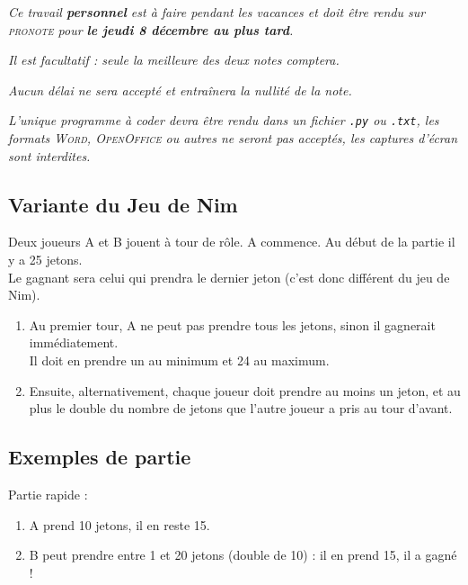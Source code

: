 \documentclass[a4paper,12pt,french]{article}
\begin{document}


\textit{Ce travail \textbf{personnel} est à faire pendant les vacances et doit être rendu sur \textsc{pronote} pour \textbf{le jeudi 8 décembre au plus tard}. }

\textit{Il est facultatif : seule la meilleure des deux notes comptera.}

\textit{Aucun délai ne sera accepté et entraînera la nullité de la note.}

\textit{L'unique programme à coder devra être rendu dans un fichier \texttt{.py} ou \texttt{.txt}, les formats \textsc{Word}, \textsc{OpenOffice} ou autres ne seront pas acceptés, les captures d'écran sont interdites.}



\subsection*{Variante du Jeu de Nim}

Deux joueurs A et B jouent à tour de rôle. A commence. Au début de la partie il y a 25 jetons.\\
Le gagnant sera celui qui prendra le dernier jeton (c'est donc différent du jeu de Nim).
\begin{enumerate}[--]
	\item 	Au premier tour, A ne peut pas prendre tous les jetons, sinon il gagnerait immédiatement.\\
			Il doit en prendre un au minimum et 24 au maximum.
	\item 	Ensuite, alternativement, chaque joueur doit prendre au moins un jeton, et au plus le double du nombre de
			jetons que l'autre joueur a pris au tour d'avant.
\end{enumerate}

\subsection*{Exemples de partie}

Partie rapide :
\begin{enumerate}[--]
	\item 	A prend 10 jetons, il en reste 15.
	\item 	B peut prendre entre 1 et 20 jetons (double de 10) : il en prend 15, il a gagné ! \\
\end{enumerate}
\end{document}
